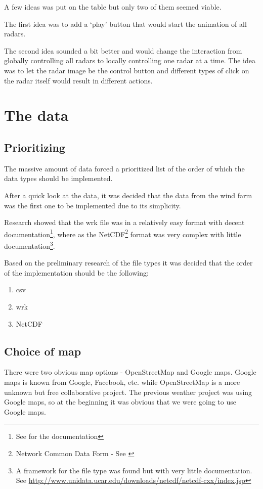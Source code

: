 A few ideas was put on the table but only two of them seemed viable.

The first idea was to add a `play' button that would start the animation of all radars.

The second idea sounded a bit better and would change the interaction from globally controlling all radars to locally controlling one radar at a time. The idea was to let the radar image be the control button and different types of click on the radar itself would result in different actions.

\section{The data}
\label{sec:the_data}
\subsection{Prioritizing}
\label{sec:prioritizing}
The massive amount of data forced a prioritized list of the order of which the data types should be implemented.

After a quick look at the data, it was decided that the data from the wind farm was the first one to be implemented due to its simplicity.

Research showed that the wrk file was in a relatively easy format with decent documentation\footnote{See \cite{VRIS} for the documentation}, where as the NetCDF\footnote{Network Common Data Form - See \cite{netcdf}} format was very complex with little documentation\footnote{A framework for the file type was found but with very little documentation. See \url{http://www.unidata.ucar.edu/downloads/netcdf/netcdf-cxx/index.jsp}}.

Based on the preliminary research of the file types it was decided that the order of the implementation should be the following:
\begin{enumerate}
\item csv
\item wrk
\item NetCDF
\end{enumerate}

\subsection{Choice of map}
\label{sec:choice_of_map}
There were two obvious map options - OpenStreetMap and Google maps. Google maps is known from Google, Facebook, etc. while OpenStreetMap is a more unknown but free collaborative project. The previous weather project was using Google maps, so at the beginning it was obvious that we were going to use Google maps.

